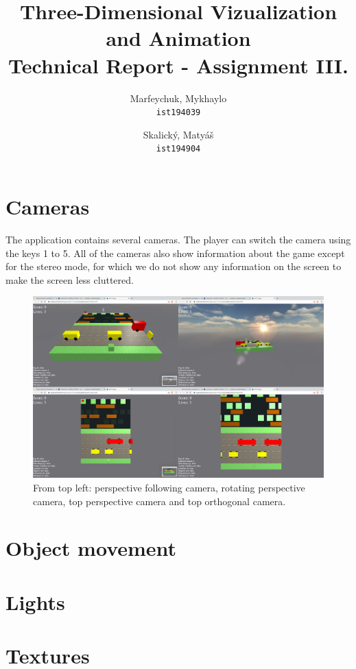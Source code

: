 \documentclass[a4paper,10pt]{article}
\title{Three-Dimensional Vizualization and Animation\\Technical Report - Assignment III.}
\author{
  Marfeychuk, Mykhaylo\\
  \texttt{ist194039}
  \and
  Skalický, Matyáš\\
  \texttt{ist194904}
}
\date{} %
\begin{document}
\maketitle


\section{Cameras}
The application contains several cameras. The player can switch the camera using the keys 1 to 5. All of the cameras also show information about the game except for the stereo mode, for which we do not show any information on the screen to make the screen less cluttered.

\begin{figure}[!htb]
	\centering
 	\includegraphics[width=\linewidth]{images/cam_merged.png}
  	\caption{From top left: perspective following camera, rotating perspective camera, top perspective camera and top orthogonal camera.}
\end{figure}

\section{Object movement}

\section{Lights}

\section{Textures}
\end{document}
